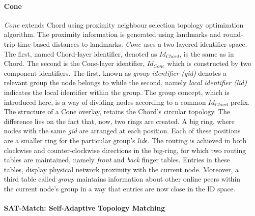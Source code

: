 \paragraph*{\bf Cone}
\textit{Cone}\cite{wang_cone_2007} extends Chord using proximity neighbour
selection topology optimization algorithm. The proximity information is
generated using landmarks and round-trip-time-based distances to landmarks.
\textit{Cone} uses a two-layered identifier space. The first, named Chord-layer
identifier, denoted as $Id_{Chord}$, is the same as in Chord. The second is the
Cone-layer identifier, $Id_{Cone}$ which is constructed by two component
identifiers. The first, known as \emph{group identifier (gid)} denotes a
relevant group the node belongs to while the second, namely \emph{local
identifier (lid)} indicates the local identifier within the group. The group
concept, which is introduced here, is a way of dividing nodes according to a
common $Id_{Chord}$ prefix.  The structure of a Cone overlay, retains the
Chord's circular topology. The difference lies on the fact that, now, two rings
are created. A big ring, where nodes with the same \emph{gid} are arranged at
each position. Each of these positions are a smaller ring for the particular
group's \emph{lid}s. The routing is achieved in both clockwise and
counter-clockwise directions in the big-ring, for which two routing tables are
maintained, namely \emph{front} and \emph{back} finger tables. Entries in these
tables, display physical network proximity with the current node. Moreover, a
third table called \emph{group} maintains information about other online peers
within the current node's group in a way that entries are now close in the ID
space.

\paragraph*{\bf SAT-Match: Self-Adaptive Topology Matching}


